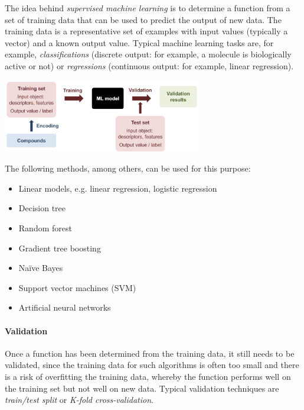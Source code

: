 
%

The idea behind \emph{supervised machine learning} is to determine a function from a set of training data that can be used to predict the output of new data. The training data is a representative set of examples with input values (typically a vector) and a known output value. Typical machine learning tasks are, for example, \emph{classifications} (discrete output: for example, a molecule is biologically active or not) or \emph{regressions} (continuous output: for example, linear regression).

\begin{center}\includegraphics[width=0.65\textwidth]{img/machine/MachineGeneralScheme.png}\end{center}

The following methods, among others, can be used for this purpose:

\begin{itemize}
    \item Linear models, e.g. linear regression, logistic regression
    \item Decision tree
    \item Random forest
    \item Gradient tree boosting
    \item Naïve Bayes
    \item Support vector machines (SVM)
    \item Artificial neural networks
\end{itemize}

\paragraph{Validation}
Once a function has been determined from the training data, it still needs to be validated, since the training data for such algorithms is often too small and there is a risk of overfitting the training data, whereby the function performs well on the training set but not well on new data. Typical validation techniques are \emph{train/test split} or \emph{K-fold cross-validation}.

